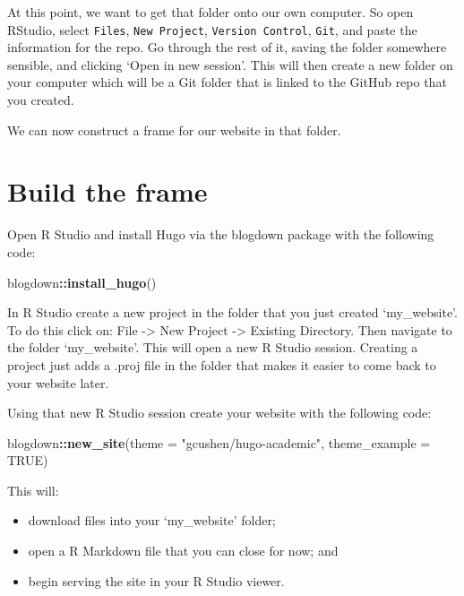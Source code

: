 \documentclass[
]{book}
\newenvironment{Shaded}{\begin{snugshade}}{\end{snugshade}}
\newcommand{\DataTypeTok}[1]{\textcolor[rgb]{0.13,0.29,0.53}{#1}}
\newcommand{\KeywordTok}[1]{\textcolor[rgb]{0.13,0.29,0.53}{\textbf{#1}}}
\newcommand{\NormalTok}[1]{#1}
\newcommand{\OperatorTok}[1]{\textcolor[rgb]{0.81,0.36,0.00}{\textbf{#1}}}
\newcommand{\OtherTok}[1]{\textcolor[rgb]{0.56,0.35,0.01}{#1}}
\newcommand{\StringTok}[1]{\textcolor[rgb]{0.31,0.60,0.02}{#1}}
\providecommand{\tightlist}{%
  \setlength{\itemsep}{0pt}\setlength{\parskip}{0pt}}
\begin{document}
At this point, we want to get that folder onto our own computer. So open RStudio, select \texttt{Files}, \texttt{New\ Project}, \texttt{Version\ Control}, \texttt{Git}, and paste the information for the repo. Go through the rest of it, saving the folder somewhere sensible, and clicking `Open in new session'. This will then create a new folder on your computer which will be a Git folder that is linked to the GitHub repo that you created.

We can now construct a frame for our website in that folder.

\hypertarget{build-the-frame}{%
\section{Build the frame}\label{build-the-frame}}

Open R Studio and install Hugo via the blogdown package with the following code:

\begin{Shaded}
\begin{Highlighting}[]
\NormalTok{blogdown}\OperatorTok{::}\KeywordTok{install_hugo}\NormalTok{()}
\end{Highlighting}
\end{Shaded}

In R Studio create a new project in the folder that you just created `my\_website'. To do this click on: File -\textgreater{} New Project -\textgreater{} Existing Directory. Then navigate to the folder `my\_website'. This will open a new R Studio session. Creating a project just adds a .proj file in the folder that makes it easier to come back to your website later.

Using that new R Studio session create your website with the following code:

\begin{Shaded}
\begin{Highlighting}[]
\NormalTok{blogdown}\OperatorTok{::}\KeywordTok{new_site}\NormalTok{(}\DataTypeTok{theme =} \StringTok{"gcushen/hugo-academic"}\NormalTok{, }\DataTypeTok{theme_example =} \OtherTok{TRUE}\NormalTok{)}
\end{Highlighting}
\end{Shaded}

This will:

\begin{itemize}
\tightlist
\item
  download files into your `my\_website' folder;
\item
  open a R Markdown file that you can close for now; and
\item
  begin serving the site in your R Studio viewer.
\end{itemize}
\end{document}
